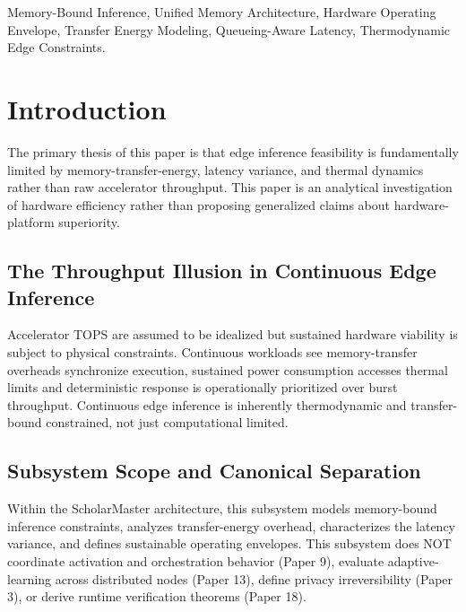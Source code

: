 \documentclass[conference]{IEEEtran}
\begin{document}
\begin{IEEEkeywords}
Memory-Bound Inference, Unified Memory Architecture, Hardware Operating Envelope, Transfer Energy Modeling, Queueing-Aware Latency, Thermodynamic Edge Constraints.
\end{IEEEkeywords}

\section{Introduction}

The primary thesis of this paper is that edge inference feasibility is fundamentally limited by memory-transfer-energy, latency variance, and thermal dynamics rather than raw accelerator throughput. This paper is an analytical investigation of hardware efficiency rather than proposing generalized claims about hardware-platform superiority.

\subsection{The Throughput Illusion in Continuous Edge Inference}
Accelerator TOPS are assumed to be idealized but sustained hardware viability is subject to physical constraints. Continuous workloads see memory-transfer overheads synchronize execution, sustained power consumption accesses thermal limits and deterministic response is operationally prioritized over burst throughput. Continuous edge inference is inherently thermodynamic and transfer-bound constrained, not just computational limited. 

\subsection{Subsystem Scope and Canonical Separation}
Within the ScholarMaster architecture, this subsystem models memory-bound inference constraints, analyzes transfer-energy overhead, characterizes the latency variance, and defines sustainable operating envelopes. This subsystem does NOT coordinate activation and orchestration behavior (Paper 9), evaluate adaptive-learning across distributed nodes (Paper 13), define privacy irreversibility (Paper 3), or derive runtime verification theorems (Paper 18).
\end{document}
